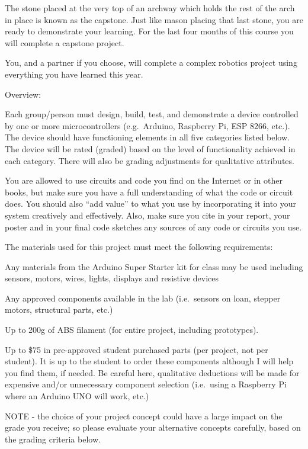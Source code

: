 \documentclass[
]{book}
\begin{document}
The stone placed at the very top of an archway which holds the rest of the arch in place is known as the capstone. Just like mason placing that last stone, you are ready to demonstrate your learning. For the last four months of this course you will complete a capstone project.

You, and a partner if you choose, will complete a complex robotics project using everything you have learned this year.

Overview:

Each group/person must design, build, test, and demonstrate a device controlled by one or more microcontrollers (e.g.~Arduino, Raspberry Pi, ESP 8266, etc.). The device should have functioning elements in all five categories listed below. The device will be rated (graded) based on the level of functionality achieved in each category. There will also be grading adjustments for qualitative attributes.

You are allowed to use circuits and code you find on the Internet or in other books, but make sure you have a full understanding of what the code or circuit does. You should also ``add value'' to what you use by incorporating it into your system creatively and effectively. Also, make sure you cite in your report, your poster and in your final code sketches any sources of any code or circuits you use.

The materials used for this project must meet the following requirements:

Any materials from the Arduino Super Starter kit for class may be used including sensors, motors, wires, lights, displays and resistive devices

Any approved components available in the lab (i.e.~sensors on loan, stepper motors, structural parts, etc.)

Up to 200g of ABS filament (for entire project, including prototypes).

Up to \$75 in pre-approved student purchased parts (per project, not per student). It is up to the student to order these components although I will help you find them, if needed. Be careful here, qualitative deductions will be made for expensive and/or unnecessary component selection (i.e.~using a Raspberry Pi where an Arduino UNO will work, etc.)

NOTE - the choice of your project concept could have a large impact on the grade you receive; so please evaluate your alternative concepts carefully, based on the grading criteria below.
\end{document}

